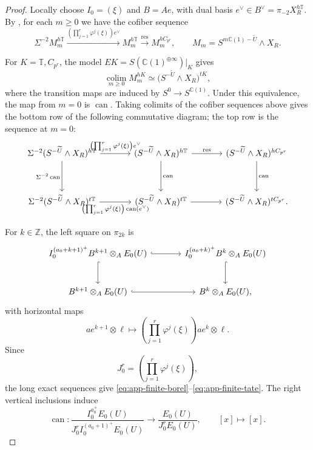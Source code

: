 \begin{proof}
Locally choose $I_0=(\xi)$ and $B=Ae$, with dual basis
$e^\vee\in B^\vee=\pi_{-2}X_R^{h\mathbb T}$.
By \cite[Lemma~3.1 and its proof]{Riggenbach}, for each $m\ge0$
we have the cofiber sequence
\[
\Sigma^{-2}M_m^{h\mathbb T}
\xrightarrow{\left(\prod_{j=1}^{r}\varphi^j(\xi)\right)e^\vee}
M_m^{h\mathbb T}
\xrightarrow{\operatorname{res}}
M_m^{hC_{p^r}},
\qquad
M_m=S^{m\mathbb C(1)-\widetilde U}\wedge X_R.
\]

For $K=\mathbb T,C_{p^r}$, the model
$EK=S(\mathbb C(1)^{\oplus\infty})|_K$ gives
\[
\operatorname*{colim}_{m\ge0}M_m^{hK}
\simeq
\bigl(S^{-\widetilde U}\wedge X_R\bigr)^{tK},
\]
where the transition maps are induced by
$S^0\to S^{\mathbb C(1)}$.
Under this equivalence, the map from $m=0$ is
$\operatorname{can}$.
Taking colimits of the cofiber sequences above gives the
bottom row of the following commutative diagram;
the top row is the sequence at $m=0$:
\[
\begin{tikzcd}[column sep=large,row sep=huge]
\Sigma^{-2}(S^{-\widetilde U}\wedge X_R)^{h\mathbb T}
  \arrow[r,"{\left(\prod_{j=1}^r\varphi^j(\xi)\right)e^\vee}"]
  \arrow[d,"\Sigma^{-2}\operatorname{can}"']
&
(S^{-\widetilde U}\wedge X_R)^{h\mathbb T}
  \arrow[r,"\res"]
  \arrow[d,"\operatorname{can}"]
&
(S^{-\widetilde U}\wedge X_R)^{hC_{p^r}}
  \arrow[d,"\operatorname{can}"]
\\
\Sigma^{-2}(S^{-\widetilde U}\wedge X_R)^{t\mathbb T}
  \arrow[r,"{\left(\prod_{j=1}^r\varphi^j(\xi)\right)
    \operatorname{can}(e^\vee)}"']
&
(S^{-\widetilde U}\wedge X_R)^{t\mathbb T}
  \arrow[r]
&
(S^{-\widetilde U}\wedge X_R)^{tC_{p^r}}.
\end{tikzcd}
\]

For $k\in\mathbb Z$, the left square on $\pi_{2k}$ is
\[
\begin{tikzcd}[column sep=large,row sep=large]
I_0^{(a_0+k+1)^+}B^{k+1}\otimes_A E_0(U)
  \arrow[r,hook]
  \arrow[d,hook]
&
I_0^{(a_0+k)^+}B^k\otimes_A E_0(U)
  \arrow[d,hook]
\\
B^{k+1}\otimes_A E_0(U)
  \arrow[r,hook]
&
B^k\otimes_A E_0(U),
\end{tikzcd}
\]
with horizontal maps
\[
ae^{k+1}\otimes\ell
\longmapsto
\left(\prod_{j=1}^r\varphi^j(\xi)\right)
ae^k\otimes\ell.
\]
Since
\[
J_0^r=\left(\prod_{j=1}^r\varphi^j(\xi)\right),
\]
the long exact sequences give
\eqref{eq:app-finite-borel}--\eqref{eq:app-finite-tate}.
The right vertical inclusions induce
\[
\operatorname{can}:
\frac{I_0^{a_0^+}E_0(U)}
     {J_0^rI_0^{(a_0+1)^+}E_0(U)}
\longrightarrow
\frac{E_0(U)}{J_0^rE_0(U)},
\qquad
[x]\longmapsto[x].
\]
\end{proof}


